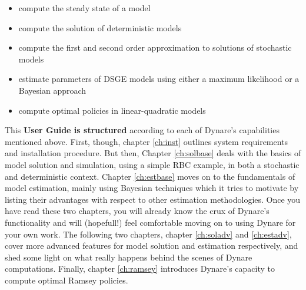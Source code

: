 \begin{itemize}
\item compute the steady state of a model
\item compute the solution of deterministic models
\item compute the first and second order approximation to solutions of stochastic models 
\item estimate parameters of DSGE models using either a maximum likelihood or a Bayesian approach
\item compute optimal policies in linear-quadratic models
\end{itemize}

This \textbf{User Guide is structured} according to each of Dynare's capabilities mentioned above. First, though, chapter \ref{ch:inst} outlines system requirements and installation procedure. But then, Chapter \ref{ch:solbase} deals with the basics of model solution and simulation, using a simple RBC example, in both a stochastic and deterministic context. Chapter \ref{ch:estbase} moves on to the fundamentals of model estimation, mainly using Bayesian techniques which it tries to motivate by listing their advantages with respect to other estimation methodologies. Once you have read these two chapters, you will already know the crux of Dynare's functionality and will (hopefull!) feel comfortable moving on to using Dynare for your own work. The following two chapters, chapter \ref{ch:soladv} and \ref{ch:estadv}, cover more advanced features for model solution and estimation respectively, and shed some light on what really happens behind the scenes of Dynare computations. Finally, chapter \ref{ch:ramsey} introduces Dynare's capacity to compute optimal Ramsey policies. \\

